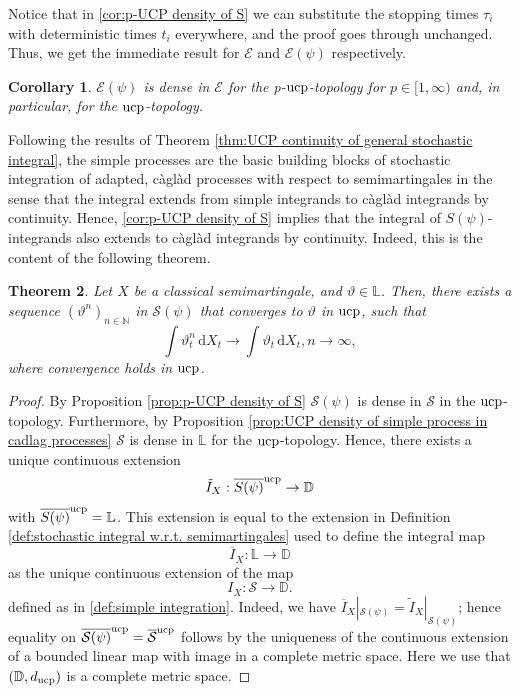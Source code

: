 \documentclass[11pt,a4paper,twoside,openany]{report}
\numberwithin{equation}{section}
\newcommand{\diff}{\mathrm{d}}
\theoremstyle{plain} %
\newtheorem{theorem}{Theorem}[section]
\newtheorem{corollary}[theorem]{Corollary}
\theoremstyle{definition} %
\theoremstyle{remark} %
\begin{document}
Notice that in \cref{cor:p-UCP density of S} we can substitute the stopping times \(\tau_i\) with deterministic times \(t_i\) everywhere, and the proof goes through unchanged. Thus, we get the immediate result for \(\mathcal{E}\) and \(\mathcal{E}(\psi)\) respectively.
\begin{corollary}\label{cor:UCP and p-UCP density of E}
    \(\mathcal{E}(\psi)\) is dense in \(\mathcal{E}\) for the p-\(\rm{ucp}\)-topology for \(p\in[1,\infty)\) and, in particular, for the \(\rm{ucp}\)-topology.
\end{corollary}
Following the results of Theorem \ref{thm:UCP continuity of general stochastic integral}, the simple processes are the basic building blocks of stochastic integration of adapted, càglàd processes with respect to semimartingales in the sense that the integral extends from simple integrands to càglàd integrands by continuity. Hence, \cref{cor:p-UCP density of S} implies that the integral of \(S(\psi)\)-integrands also extends to càglàd integrands by continuity. Indeed, this is the content of the following theorem.
\begin{theorem}\label{thm:Approx of stoch. Integrals}
    Let \(X\) be a classical semimartingale, and \(\vartheta\in \mathbb{L}\). Then, there exists a sequence \((\vartheta^n)_{n\in\mathbb{N}}\) in \(\mathcal{S}(\psi)\) that converges to \(\vartheta\) in \(\rm{ucp}\), such that
    \begin{equation*}
        \int \vartheta_t^n\,\diff X_t \to \int \vartheta_t\,\diff X_t, n\to\infty,
    \end{equation*}
    where convergence holds in \(\rm{ucp}\).
\end{theorem}
\begin{proof}
 By Proposition \ref{prop:p-UCP density of S} \(\mathcal{S}(\psi)\) is dense in \(\mathcal{S}\) in the \(\rm{ucp}\)-topology. Furthermore, by Proposition \ref{prop:UCP density of simple process in cadlag processes} \(\mathcal{S}\) is dense in \(\mathbb{L}\) for the \(\rm{ucp}\)-topology. Hence, there exists a unique continuous extension 
    \begin{equation*}
        \tilde{I}_X:\overline{S(\psi)}^{\rm{ucp}}\to\mathbb{D}
    \end{equation*} 
    with \(\overline{S(\psi)}^{\rm{ucp}}=\mathbb{L}\). This extension is equal to the extension in Definition \ref{def:stochastic integral w.r.t. semimartingales} used to define the integral map
    \begin{equation*}
        \overline{I}_X:\mathbb{L}\to\mathbb{D}
    \end{equation*} 
    as the unique continuous extension of the map 
    \begin{equation*}
        I_X:\mathcal{S}\to \mathbb{D}.
    \end{equation*}
    defined as in \eqref{def:simple integration}.
    Indeed, we have
 \( \overline{I}_X|_{\mathcal{S}(\psi)}=\widetilde{I}_X|_{\mathcal{S}(\psi)}\); hence equality on \(\overline{\mathcal{S}(\psi)}^{\rm{ucp}}=\overline{\mathcal{S}}^{\rm{ucp}}\) follows by the uniqueness of the continuous extension of a bounded linear map with image in a complete metric space. Here we use that \((\mathbb{D},d_{\rm{ucp}})\) is a complete metric space.
\end{proof}
\end{document}
